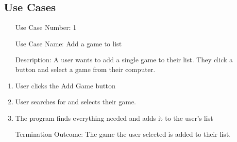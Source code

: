 \documentclass[10pt,conference,onecolumn,compsoc]{IEEEtran}
\begin{document}
\subsection{Use Cases}
%
%
%
%
%



\begin{itemize}
\item[Use Case Number:] 1
\item[Use Case Name:] Add a game to list
\item[Description:] A user wants to add a single game to their list. They click a button and select a game from their computer.
\end{itemize}
%
%
\begin{enumerate}
\item User clicks the Add Game button
\item User searches for and selects their game.
\item The program finds everything needed and adds it to the user's list
\item[Termination Outcome:] The game the user selected is added to their list.
\end{enumerate}
%
%
%
%
%
\end{document}
